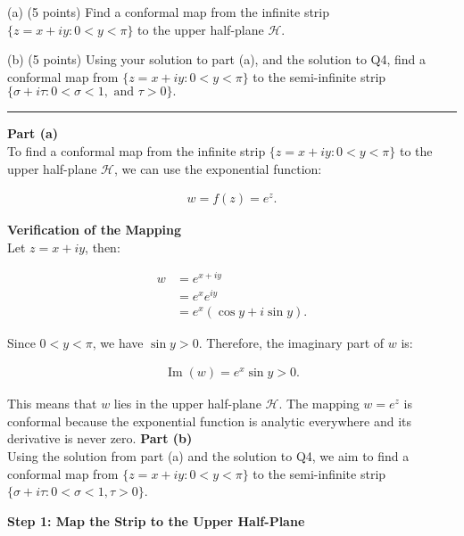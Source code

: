 \begin{example}
    (a) (5 points) Find a conformal map from the infinite strip $\{ z = x + iy : 0 < y < \pi \}$
    to the upper half-plane $\mathcal{H}$.

    (b) (5 points) Using your solution to part (a), and the solution to Q4, find a conformal map from $\{ z = x + iy : 0 < y < \pi \}$ to the semi-infinite strip $\{ \sigma + i\tau : 0 < \sigma < 1, \text{ and } \tau > 0 \}.$

    \hrule
    \vspace{0.5cm}

    \textbf{Part (a)} \\

    To find a conformal map from the infinite strip $\{ z = x + iy : 0 < y < \pi \}$ to the upper half-plane $\mathcal{H}$, we can use the exponential function:

    \begin{align*}
        w = f(z) = e^{z}.
    \end{align*}

    \textbf{Verification of the Mapping} \\

    Let $z = x + iy$, then:

    \begin{align*}
        w & = e^{x + iy}                 \\
          & = e^{x} e^{i y}              \\
          & = e^{x} (\cos y + i \sin y).
    \end{align*}

    Since $0 < y < \pi$, we have $\sin y > 0$. Therefore, the imaginary part of $w$ is:

    \begin{align*}
        \operatorname{Im}(w) = e^{x} \sin y > 0.
    \end{align*}

    This means that $w$ lies in the upper half-plane $\mathcal{H}$. The mapping $w = e^{z}$ is conformal because the exponential function is analytic everywhere and its derivative is never zero.
    \textbf{Part (b)} \\

    Using the solution from part (a) and the solution to Q4, we aim to find a conformal map from $\{ z = x + iy : 0 < y < \pi \}$ to the semi-infinite strip $\{ \sigma + i\tau : 0 < \sigma < 1, \tau > 0 \}$.

    \textbf{Step 1: Map the Strip to the Upper Half-Plane} \\


\end{example}

